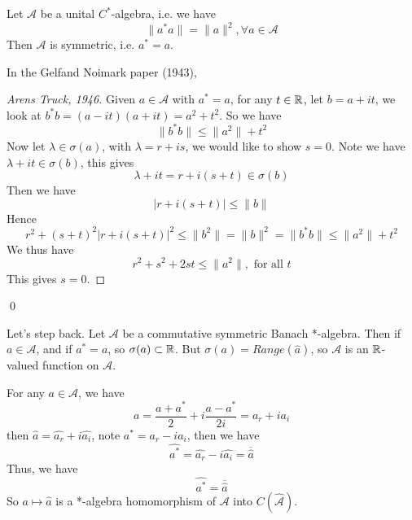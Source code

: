 \begin{proposition}
    Let $\mathcal{A}$ be a unital $C^*$-algebra, i.e. we have
    \begin{equation*}
        \|a^*a\|=\|a\|^2, \forall a\in\mathcal{A}
    \end{equation*}
    Then $\mathcal{A}$ is symmetric, i.e. $a^*=a$.
\end{proposition}
In the Gelfand Noimark paper (1943), 
\begin{proof}[Arens Truck, 1946]
    Given $a\in\mathcal{A}$ with $a^*=a$, for any $t\in\mathbb{R}$, let $b=a+it$, we look at $b^*b=(a-it)(a+it)=a^2+t^2$. So we have
    \begin{equation*}
        \|b^*b\|\leq\|a^2\|+t^2
    \end{equation*}
    Now let $\lambda\in\sigma(a)$, with $\lambda=r+is$, we would like to show $s=0$. Note we have $\lambda+it\in\sigma(b)$, this gives
    \begin{equation*}
        \lambda+it=r+i(s+t)\in\sigma(b)
    \end{equation*}
    Then we have
    \begin{equation*}
        |r+i(s+t)|\leq\|b\|
    \end{equation*}
    Hence
    \begin{equation*}
        r^2+(s+t)^2|r+i(s+t)|^2\leq\|b^2\|=\|b\|^2=\|b^*b\|\leq\|a^2\|+t^2
    \end{equation*}
    We thus have
    \begin{equation*}
        r^2+s^2+2st\leq\|a^2\|, \text{ for all } t
    \end{equation*}
    This gives $s=0$.
\end{proof}
\qed

Let's step back. Let $\mathcal{A}$ be a commutative symmetric Banach *-algebra. Then if $a\in\mathcal{A}$, and if $a^*=a$, so $\sigma(a)\subset\mathbb{R}$. But $\sigma(a)=Range(\widehat{a})$, so $\mathcal{A}$ is an $\mathbb{R}$-valued function on $\mathcal{A}$.

For any $a\in\mathcal{A}$, we have
\begin{equation*}
    a=\frac{a+a^*}{2}+i\frac{a-a^*}{2i}=a_r+ia_i
\end{equation*}
then $\widehat{a}=\widehat{a_r}+i\widehat{a_i}$, note $a^*=a_r-ia_i$, then we have
\begin{equation*}
    \widehat{a^*}=\widehat{a_r}-i\widehat{a_i}=\overline{\widehat{a}}
\end{equation*} 
Thus, we have
\begin{equation*}
    \widehat{a^*}=\overline{\widehat{a}}
\end{equation*}
So $a\mapsto\widehat{a}$ is a *-algebra homomorphism of $\mathcal{A}$ into $C(\widehat{\mathcal{A}})$.

